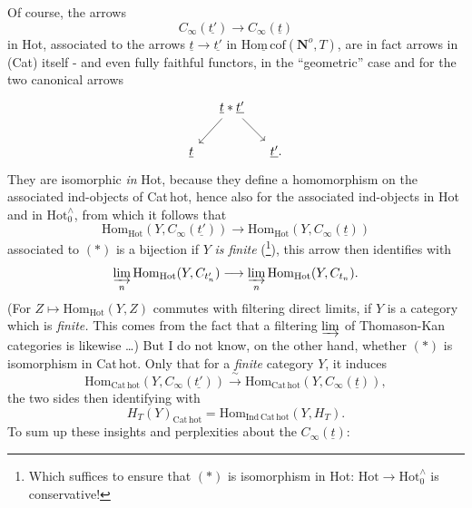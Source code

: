 \documentclass[11pt]{article}
\newcommand{\printedpage}[1]{\marginpar{\footnotesize p.~#1}}
\newcommand{\msp}[1]{\marginpar{\footnotesize [#1]}}
\newcommand{\Hot}{\mathrm{Hot}}
\newcommand{\Hotz}{\mathrm{Hot}_0^{\wedge}}
\newcommand{\Hc}{\underline{\mathrm{Hom\,cof}}}
\newcommand{\Nop}{\mathbf{N}^o}
\begin{document}
\printedpage{76}
\msp{page 121}
Of course, the arrows
\[
C_\infty(\underline{t'}) \longrightarrow C_\infty(\underline{t}) \tag*{$(*)$}
\]
in Hot, associated to the arrows $\underline{t} \longrightarrow \underline{t'}$ in $\Hc(\Nop, T)$, are in fact arrows in %
(Cat) itself - and even fully faithful functors, in the ``geometric'' case and for the two canonical arrows
\[
\begin{tikzcd}[column sep=small]
 & \underline{t} * \underline{t'} \arrow[ld] \arrow[rd] & \\
\underline{t} & & \underline{t'}.
\end{tikzcd}
\]
They are isomorphic \textit{in} Hot, because they define a homomorphism on the associated ind-objects of Cat\,hot, hence also for the associated ind-objects in Hot and in $\Hotz$, from which it follows that
\[
\mathrm{Hom}_{\Hot}(Y, C_\infty(\underline{t'})) \longrightarrow \mathrm{Hom}_{\Hot}(Y, C_\infty(\underline{t}))
\]
associated to $(*)$ is a bijection if $Y$ \textit{is finite} (\footnote[26]{Which suffices to ensure that $(*)$ is isomorphism in Hot: $\Hot \longrightarrow \Hotz$ is conservative!}), this arrow then identifies with
\[
\underset{n}{\varinjlim}\, \mathrm{Hom}_{\Hot}(Y, C_{t'_n}) \longrightarrow \underset{n}{\varinjlim}\, \mathrm{Hom}_{\Hot}(Y, C_{t_n}).
\]
(For $Z \longmapsto \mathrm{Hom}_{\Hot}(Y, Z)$ commutes with filtering direct limits, if $Y$ is a category which is \textit{finite.} This comes from the fact that a filtering $\varinjlim$ of Thomason-Kan categories is likewise \dots) But I do not know, on the other hand, whether $(*)$ is isomorphism in Cat\,hot. Only that for a \textit{finite} category $Y$, it induces
\[
\mathrm{Hom}_{\mathrm{Cat\,hot}}(Y, C_\infty(\underline{t'})) \xrightarrow{\ \sim\ } \mathrm{Hom}_{\mathrm{Cat\,hot}}(Y, C_\infty(\underline{t})),
\]
the two sides then identifying with
\msp{page 122}
\[
H_T(Y)_{\mathrm{Cat\,hot}} = \mathrm{Hom}_{\mathrm{Ind\,Cat\,hot}}(Y, H_T).
\]
To sum up these insights and perplexities about the $C_\infty(\underline{t})$:
\end{document}
